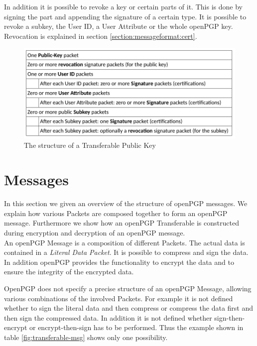 In addition it is possible to revoke a key or certain parts of it. This is done by signing the part and appending the signature of a certain type. It is possible to revoke a subkey, the User ID, a User Attribute or the whole openPGP key. Revocation is explained in section \ref{section:messageformat:cert}.

\begin{figure}[h]
	\centering
	\includegraphics[width=1\linewidth]{figures/transferable-key.png}
	\caption{The structure of a Transferable Public Key}
	\label{fig:transferable-key}
\end{figure}

\section{Messages}
\label{section:messageformat:messages}

In this section we given an overview of the structure of openPGP messages. We explain how various Packets are composed together to form an openPGP message. Furthermore we show how an openPGP Transferable is constructed during encryption and decryption of an openPGP message. \\

An openPGP Message is a composition of different Packets. The actual data is contained in a \textit{Literal Data Packet}. It is possible to compress and sign the data. In addition openPGP provides the functionality to encrypt the data and to ensure the integrity of the encrypted data.

OpenPGP does not specify a precise structure of an openPGP Message, allowing various combinations of the involved Packets. For example it is not defined whether to sign the literal data and then compress or compress the data first and then sign the compressed data. In addition it is not defined whether sign-then-encrypt or encrypt-then-sign has to be performed. Thus the example shown in table \ref{fig:transferable-msg} shows only one possibility.


